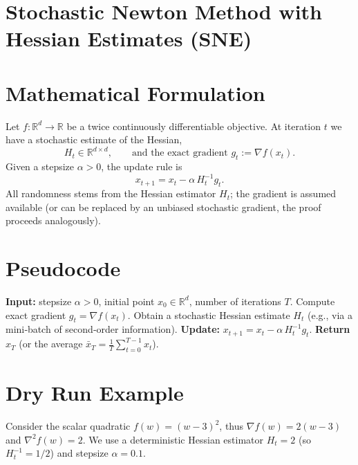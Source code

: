 \documentclass[11pt]{article}
\begin{document}
\section*{Stochastic Newton Method with Hessian Estimates (SNE)}

\section*{Mathematical Formulation}
Let $f:\mathbb{R}^{d}\rightarrow\mathbb{R}$ be a twice continuously differentiable objective.  
At iteration $t$ we have a stochastic estimate of the Hessian,
\[
H_{t}\in\mathbb{R}^{d\times d},
\qquad
\text{and the exact gradient }g_{t}:=\nabla f(x_{t}).
\]
Given a stepsize $\alpha>0$, the update rule is
\begin{equation}\label{eq:update}
x_{t+1}=x_{t}-\alpha\,H_{t}^{-1}g_{t}.
\end{equation}
All randomness stems from the Hessian estimator $H_{t}$; the gradient is assumed available (or can be replaced by an unbiased stochastic gradient, the proof proceeds analogously).

\section*{Pseudocode}
\begin{algorithm}[H]
\caption{Stochastic Newton (SNE)}
\begin{algorithmic}[1]
\State \textbf{Input:} stepsize $\alpha>0$, initial point $x_{0}\in\mathbb{R}^{d}$, number of iterations $T$.
    \State Compute exact gradient $g_{t}= \nabla f(x_{t})$.
    \State Obtain a stochastic Hessian estimate $H_{t}$ (e.g., via a mini‑batch of second‑order information).
    \State \textbf{Update:} $x_{t+1}=x_{t}-\alpha\,H_{t}^{-1}g_{t}$.
\EndFor
\State \textbf{Return} $x_{T}$ (or the average $\bar x_T=\frac1T\sum_{t=0}^{T-1}x_{t}$).
\end{algorithmic}
\end{algorithm}

\section*{Dry Run Example}
Consider the scalar quadratic $f(w)=(w-3)^{2}$, thus $\nabla f(w)=2(w-3)$ and $\nabla^{2}f(w)=2$.
We use a deterministic Hessian estimator $H_{t}=2$ (so $H_{t}^{-1}=1/2$) and stepsize $\alpha=0.1$.
\end{document}
